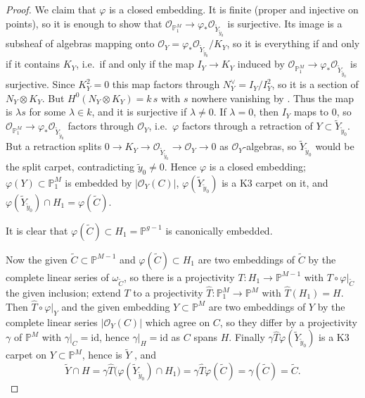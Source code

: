 \documentclass[11pt,twoside]{amsart}
\theoremstyle{plain}
\theoremstyle{definition}
\newcommand{\PP}{\mathbb{P}}
\newcommand{\PM}{\mathbb{P}^M}
\newcommand{\OO}{\mathcal{O}}
\newcommand{\id}{\mathrm{id}}
\newcommand{\Yt}{\widetilde{Y}}
\newcommand{\Ct}{\widetilde{C}}
\newcommand{\yt}{\tilde{y}}
\begin{document}
\begin{proof}
We claim that $\varphi$ is a closed embedding. It is finite (proper and injective on points), so it is enough to show that $\OO_{\PP^M_1}\to\varphi_*\OO_{\Yt_{\yt_0}}$ is surjective. Its image is a subsheaf of algebras mapping onto $\OO_Y=\varphi_*\OO_{\Yt_{\yt_0}}/K_Y$, so it is everything if and only if it contains $K_Y$, i.e.\ if and only if the map $I_Y\to K_Y$ induced by $\OO_{\PP^M_1}\to\varphi_*\OO_{\Yt_{\yt_0}}$ is surjective. Since $K_Y^2=0$ this map factors through $N_Y^{\vee}=I_Y/I_Y^2$, so it is a section of $N_Y\otimes K_Y$. But $H^0(N_Y\otimes K_Y)=k\,s$ with $s$ nowhere vanishing by \cite[Proposition~1.7]{GP97}. Thus the map is $\lambda s$ for some $\lambda\in k$, and it is surjective if $\lambda\ne0$. If $\lambda=0$, then $I_Y$ maps to $0$, so $\OO_{\PP^M_1}\to\varphi_*\OO_{\Yt_{\yt_0}}$ factors through $\OO_Y$, i.e.\ $\varphi$ factors through a retraction of $Y\subset\Yt_{\yt_0}$. But a retraction splits $0\to K_Y\to\OO_{\Yt_{\yt_0}}\to\OO_Y\to0$ as $\OO_Y$-algebras, so $\Yt_{\yt_0}$ would be the split carpet, contradicting $\widetilde y_0 \neq 0$. Hence $\varphi$ is a closed embedding; $\varphi(Y)\subset\PP^M_1$ is embedded by $|\OO_Y(C)|$, $\varphi(\Yt_{\yt_0})$ is a K3 carpet on it, and $\varphi(\Yt_{\yt_0})\cap H_1=\varphi(\Ct)$.

It is clear that $\varphi(\Ct)\subset H_1=\PP^{g-1}$ is canonically embedded.

Now the given $\Ct\subset\PP^{M-1}$ and $\varphi(\Ct)\subset H_1$ are two embeddings of $\Ct$ by the complete linear series of $\omega_{\Ct}$, so there is a projectivity $T\colon H_1\to\PP^{M-1}$ with $T\circ\varphi|_{\Ct}$ the given inclusion; extend $T$ to a projectivity $\hat T\colon\PP^M_1\to\PM$ with $\hat T(H_1)=H$. Then $\hat T\circ\varphi|_Y$ and the given embedding $Y\subset\PM$ are two embeddings of $Y$ by the complete linear series $|\OO_Y(C)|$ which agree on $C$, so they differ by a projectivity $\gamma$ of $\PM$ with $\gamma|_C=\id$, hence $\gamma|_H=\id$ as $C$ spans $H$. Finally $\gamma\hat T\varphi(\Yt_{\yt_0})$ is a K3 carpet on $Y\subset\PM$, hence is $\Yt$ \cite[Proposition~1.7]{GP97}, and
\[
\Yt\cap H=\gamma\hat T\big(\varphi(\Yt_{\yt_0})\cap H_1\big)=\gamma\hat T\varphi(\Ct)=\gamma(\Ct)=\Ct .
\]
\end{proof}


\end{document}

